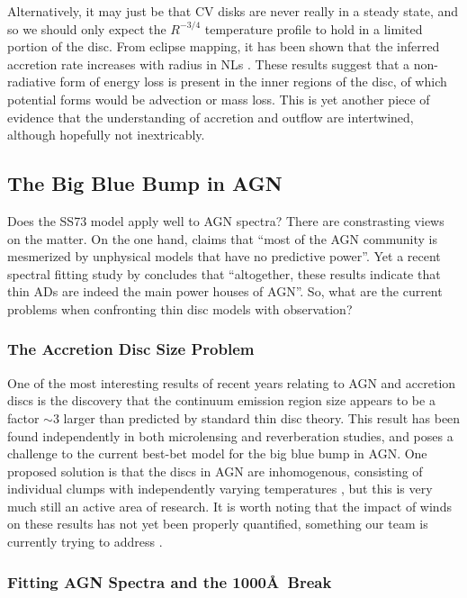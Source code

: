 Alternatively, it may just be that CV disks are never really in
a steady state, and so we should only expect the $R^{-3/4}$
temperature profile to hold in a limited portion of the disc.
From eclipse mapping, it has been shown that the inferred accretion
rate increases with radius in NLs \citep{rutten1992, horne1993}.
These results suggest that a non-radiative form of energy loss
is present in the inner regions of the disc, of which potential forms
would be advection or mass loss. This is yet another piece of evidence
that the understanding of accretion and outflow 
are intertwined, although hopefully not inextricably.

\subsection{The Big Blue Bump in AGN}

Does the SS73 model apply well to AGN spectra? There are constrasting views on the matter.
On the one hand, \cite{antonucci2013} claims that ``most of the AGN community is mesmerized by unphysical models that have no predictive power''. 
Yet a recent spectral fitting study by \cite{capellupo2015} concludes that 
``altogether, these results indicate that thin ADs are indeed the 
main power houses of AGN''. So, what are the current problems when 
confronting thin disc models with observation? 

\subsubsection{The Accretion Disc Size Problem}

One of the most interesting results of recent years relating to AGN and accretion discs is
the discovery that the continuum emission region size appears to be
a factor $\sim3$ larger than predicted by standard thin disc theory. This result
has been found independently in both microlensing \citep{morgan2010,dai2010} 
and reverberation \citep{edelson2015} studies, and poses a challenge to the 
current best-bet model for the big blue bump in AGN. 
One proposed solution is that the discs in AGN are inhomogenous,
consisting of individual clumps with independently
varying temperatures \citep{dexteragol2011}, but this is very much
still an active area of research. It is worth noting that the impact
of winds on these results has not yet been properly quantified, something
our team is currently trying to address \citep{mangham}.

\subsubsection{Fitting AGN Spectra and the 1000\AA\ Break}

